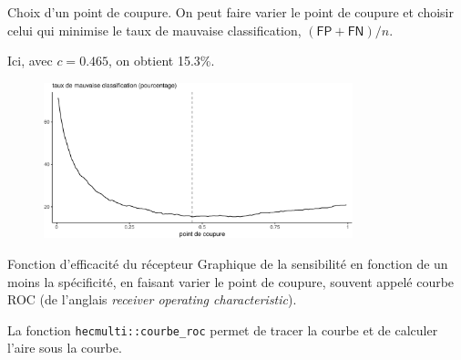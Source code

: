 \documentclass[
  ignorenonframetext,
]{beamer}
\newenvironment{Shaded}{\begin{snugshade}}{\end{snugshade}}
\newcommand{\AttributeTok}[1]{\textcolor[rgb]{0.40,0.45,0.13}{#1}}
\newcommand{\ConstantTok}[1]{\textcolor[rgb]{0.56,0.35,0.01}{#1}}
\newcommand{\DocumentationTok}[1]{\textcolor[rgb]{0.37,0.37,0.37}{\textit{#1}}}
\newcommand{\FunctionTok}[1]{\textcolor[rgb]{0.28,0.35,0.67}{#1}}
\newcommand{\NormalTok}[1]{\textcolor[rgb]{0.00,0.23,0.31}{#1}}
\newcommand{\OtherTok}[1]{\textcolor[rgb]{0.00,0.23,0.31}{#1}}
\newcommand{\SpecialCharTok}[1]{\textcolor[rgb]{0.37,0.37,0.37}{#1}}
\begin{document}
\begin{frame}{Choix d'un point de coupure.}
\protect\hypertarget{choix-dun-point-de-coupure.}{}
On peut faire varier le point de coupure et choisir celui qui minimise
le taux de mauvaise classification, \((\mathsf{FP} + \mathsf{FN})/n\).

Ici, avec \(c=0.465\), on obtient 15.3\%.

\begin{figure}

{\centering \includegraphics[width=0.8\textwidth,height=\textheight]{MATH60602-diapos7_files/figure-beamer/unnamed-chunk-7-1.pdf}

}

\end{figure}
\end{frame}

\begin{frame}[fragile]{Fonction d'efficacité du récepteur}
\protect\hypertarget{fonction-defficacituxe9-du-ruxe9cepteur}{}
Graphique de la sensibilité en fonction de un moins la spécificité, en
faisant varier le point de coupure, souvent appelé courbe ROC (de
l'anglais \emph{receiver operating characteristic}).

La fonction \texttt{hecmulti::courbe\_roc} permet de tracer la courbe et
de calculer l'aire sous la courbe.

\begin{Shaded}
\end{Shaded}
\end{frame}
\end{document}

